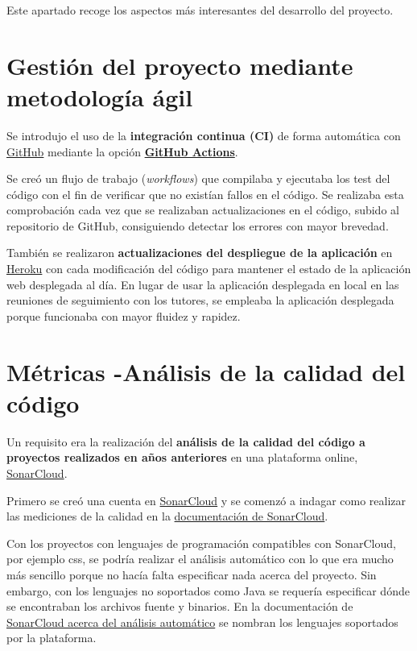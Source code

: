 
Este apartado recoge los aspectos más interesantes del desarrollo del proyecto.

\section{Gestión del proyecto mediante metodología ágil}
Se introdujo el uso de la \textbf{integración continua (CI)} de forma automática con \href{https://github.com/dbo1001/Gestor-TFG-2021/blob/master/.github/workflows/github-ci.yml}{GitHub} mediante la opción \textbf{\href{https://github.com/dbo1001/Gestor-TFG-2021/actions}{GitHub Actions}}. 

Se creó un flujo de trabajo (\emph{workflows}) que compilaba y  ejecutaba los test del código con el fin de verificar que no existían fallos en el código. Se realizaba esta comprobación cada vez que se realizaban actualizaciones en el código, subido al repositorio de GitHub, consiguiendo detectar los errores con mayor brevedad.

También se realizaron \textbf{actualizaciones del despliegue de la aplicación} en \href{https://gestor-tfg-2021.herokuapp.com/}{Heroku} con cada modificación del código para mantener el estado de la aplicación web desplegada al día. En lugar de usar la aplicación desplegada en local en las reuniones de seguimiento con los tutores, se empleaba la aplicación desplegada porque funcionaba con mayor fluidez y rapidez.

\section{Métricas -Análisis de la calidad del código}
Un requisito era la realización del \textbf{análisis de la calidad del código a proyectos realizados en años anteriores} en una plataforma online, \href{https://sonarcloud.io/organizations/dbo1001/projects/}{SonarCloud}. 

Primero se creó una cuenta en \href{https://sonarcloud.io}{SonarCloud} y se comenzó a indagar como realizar las mediciones de la calidad en la \href{https://sonarcloud.io/documentation}{documentación de SonarCloud}. 

Con los proyectos con lenguajes de programación compatibles con SonarCloud, por ejemplo css, se podría realizar el análisis automático con lo que era mucho más sencillo porque no hacía falta especificar nada acerca del proyecto. Sin embargo, con los lenguajes no soportados como Java se requería especificar dónde se encontraban los archivos fuente y binarios.
En la documentación de \href{https://sonarcloud.io/documentation/analysis/automatic-analysis/}{SonarCloud acerca del análisis automático} se nombran los lenguajes soportados por la plataforma.
 
